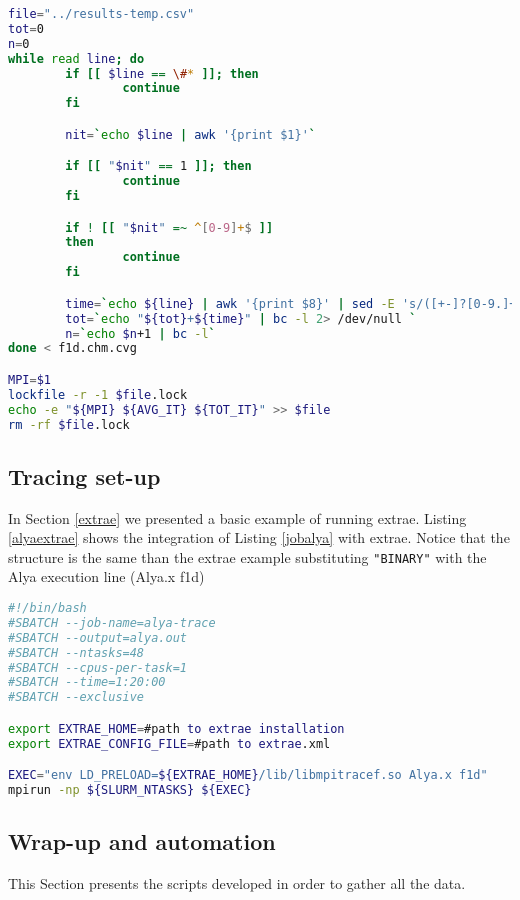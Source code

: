 \begin{lstlisting}[language=sh, caption={gather.sh script}, label={gather.sh}]
file="../results-temp.csv"
tot=0
n=0
while read line; do
        if [[ $line == \#* ]]; then
                continue
        fi

        nit=`echo $line | awk '{print $1}'`

        if [[ "$nit" == 1 ]]; then
                continue
        fi

        if ! [[ "$nit" =~ ^[0-9]+$ ]]
        then
                continue
        fi

        time=`echo ${line} | awk '{print $8}' | sed -E 's/([+-]?[0-9.]+)[eE]\+?(-?)([0-9]+)/(\1*10^\2\3)/g'`
        tot=`echo "${tot}+${time}" | bc -l 2> /dev/null `
        n=`echo $n+1 | bc -l`
done < f1d.chm.cvg

MPI=$1
lockfile -r -1 $file.lock
echo -e "${MPI} ${AVG_IT} ${TOT_IT}" >> $file
rm -rf $file.lock
\end{lstlisting}

\subsection{Tracing set-up}

In Section \ref{extrae} we presented a basic example of running extrae. Listing \ref{alyaextrae} shows the integration of Listing \ref{jobalya} with extrae. Notice that the structure is the same than the extrae example substituting \texttt{"BINARY"} with the Alya execution line (Alya.x f1d) 
\clearpage
\begin{lstlisting}[language=sh, caption={Running Alya with extrae and SLURM}, label={alyaextrae}]
#!/bin/bash
#SBATCH --job-name=alya-trace
#SBATCH --output=alya.out
#SBATCH --ntasks=48
#SBATCH --cpus-per-task=1
#SBATCH --time=1:20:00
#SBATCH --exclusive

export EXTRAE_HOME=#path to extrae installation
export EXTRAE_CONFIG_FILE=#path to extrae.xml

EXEC="env LD_PRELOAD=${EXTRAE_HOME}/lib/libmpitracef.so Alya.x f1d"
mpirun -np ${SLURM_NTASKS} ${EXEC}
\end{lstlisting}

\subsection{Wrap-up and automation}

This Section presents the scripts developed in order to gather all the data. 

